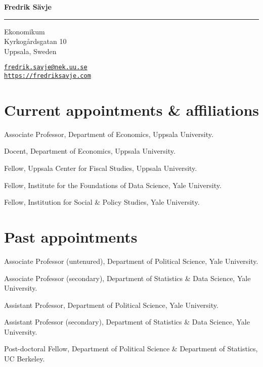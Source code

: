 \documentclass[10pt,letterpaper]{article}
\newenvironment{datelist}{
	\begin{list}{}{
		\setlength{\parskip}{0pt}
		\setlength{\itemsep}{4pt}
		\setlength{\parsep}{0.3em}
		\setlength{\leftmargin}{5.85em}
		\setlength{\labelwidth}{5.85em}
		\setlength{\labelsep}{1.5em}
		}
	}{
\end{list}
}
\newcommand{\dateitem}[2][]{\item[{#1}] {#2}}
\newenvironment{infolist}{
	\begin{list}{}{
		\setlength{\parskip}{0pt}
		\setlength{\itemsep}{4pt}
		\setlength{\parsep}{0.3em}
		\setlength{\leftmargin}{0em}
		\setlength{\labelwidth}{0em}
		}
	}{
\end{list}
}
\newcommand{\infoitem}[1]{\item {#1}}
\begin{document}
	{\huge \bf Fredrik Sävje}

	\rule{\textwidth}{1pt}

	\bigskip


	\begin{minipage}[t]{0.495\textwidth}
		Ekonomikum \\
		Kyrkogårdsgatan 10 \\
		Uppsala, Sweden
	\end{minipage}
	\begin{minipage}[t]{0.495\textwidth}
		\href{mailto:fredrik.savje@nek.uu.se}{\texttt{fredrik.savje@nek.uu.se}} \\
		\href{https://fredriksavje.com}{\texttt{https://fredriksavje.com}}
	\end{minipage}

	\vspace{0.3in}

	\section*{Current appointments \& affiliations}

	\begin{infolist}
		\infoitem{Associate Professor, Department of Economics, Uppsala University.}
		\infoitem{Docent, Department of Economics, Uppsala University.}
		\infoitem{Fellow, Uppsala Center for Fiscal Studies, Uppsala University.}
		\infoitem{Fellow, Institute for the Foundations of Data Science, Yale University.}
		\infoitem{Fellow, Institution for Social \& Policy Studies, Yale University.}
	\end{infolist}


	\section*{Past appointments}

	\begin{datelist}
		\dateitem[2023--2024]{Associate Professor (untenured), Department of Political Science, Yale University.}
		\dateitem[2023--2024]{Associate Professor (secondary), Department of Statistics \& Data Science, Yale University.}
		\dateitem[2017--2023]{Assistant Professor, Department of Political Science, Yale University.}
		\dateitem[2018--2023]{Assistant Professor (secondary), Department of Statistics \& Data Science, Yale University.}
		\dateitem[2015--2017]{Post-doctoral Fellow, Department of Political Science \& Department of Statistics, UC Berkeley.}
	\end{datelist}
\end{document}
